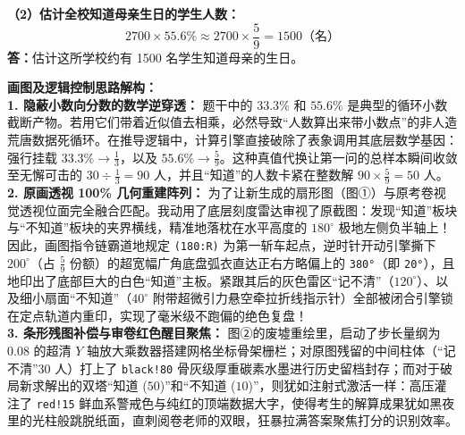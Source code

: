 \begin{center}
\end{center}

\vspace{0.4cm}
\textbf{（2）估计全校知道母亲生日的学生人数：}
\[
2700 \times 55.6\% \approx 2700 \times \frac{5}{9} = 1500 \text{（名）}
\]
\textbf{答：}估计这所学校约有 1500 名学生知道母亲的生日。

\vspace{0.4cm}
{\small\color{blue!70!black}
\textbf{画图及逻辑控制思路解构：}\\
\textbf{1. 隐蔽小数向分数的数学逆穿透：} 题干中的 $33.3\%$ 和 $55.6\%$ 是典型的循环小数截断产物。若用它们带着近似值去相乘，必然导致“人数算出来带小数点”的非人造荒唐数据死循环。在推导逻辑中，计算引擎直接破除了表象调用其底层数学基因：强行挂载 $33.3\% \rightarrow \frac{1}{3}$，以及 $55.6\% \rightarrow \frac{5}{9}$。这种真值代换让第一问的总样本瞬间收敛至无懈可击的 $30 \div \frac{1}{3} = 90$ 人，并且“知道”的人数卡紧在整数解 $90 \times \frac{5}{9} = 50$ 人。\\
\textbf{2. 原画透视 100\% 几何重建阵列：} 为了让新生成的扇形图（图①）与原考卷视觉透视位面完全融合匹配。我动用了底层刻度雷达审视了原截图：发现“知道”板块与“不知道”板块的夹界横线，精准地落枕在水平高度的 $180^\circ$ 极地左侧负半轴上！因此，画图指令链霸道地规定 \texttt{(180:R)} 为第一斩车起点，逆时针开动引擎撕下 $200^\circ$（占 $\frac{5}{9}$ 份额）的超宽幅广角底盘弧衣直达正右方略偏上的 \texttt{380°}（即 \texttt{20°}），且地印出了底部巨大的白色“知道”主板。紧跟其后的灰色雷区“记不清”（$120^\circ$）、以及细小扇面“不知道”（$40^\circ$ 附带超微引力悬空牵拉折线指示针）全部被闭合引擎锁在定点轨道内重印，实现了毫米级不跑偏的绝色复盘！\\
\textbf{3. 条形残图补偿与审卷红色醒目聚焦：} 图②的废墟重绘里，启动了步长量纲为 $0.08$ 的超清 $Y$ 轴放大乘数器搭建网格坐标骨架栅栏；对原图残留的中间柱体（“记不清”$30$ 人）打上了 \texttt{black!80} 骨灰级厚重碳素水墨进行历史留档封存；而对于破局新求解出的双塔“知道 ($50$)”和“不知道 ($10$)”，则犹如注射式激活一样：高压灌注了 \texttt{red!15} 鲜血系警戒色与纯红的顶端数据大字，使得考生的解算成果犹如黑夜里的光柱般跳脱纸面，直刺阅卷老师的双眼，狂暴拉满答案聚焦打分的识别效率。
}


